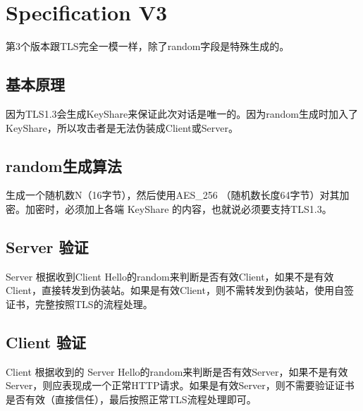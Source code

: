\chapter{Specification V3}
第3个版本跟TLS完全一模一样，除了random字段是特殊生成的。

\section{基本原理}
因为TLS1.3会生成KeyShare来保证此次对话是唯一的。因为random生成时加入了KeyShare，所以攻击者是无法伪装成Client或Server。

\section{random生成算法}
生成一个随机数N（16字节），然后使用AES\_256 （随机数长度64字节）对其加密。加密时，必须加上各端 KeyShare 的内容，也就说必须要支持TLS1.3。

\section{Server 验证}
Server 根据收到Client Hello的random来判断是否有效Client，如果不是有效Client，直接转发到伪装站。如果是有效Client，则不需转发到伪装站，使用自签证书，完整按照TLS的流程处理。

\section{Client 验证}
Client 根据收到的 Server Hello的random来判断是否有效Server，如果不是有效Server，则应表现成一个正常HTTP请求。如果是有效Server，则不需要验证证书是否有效（直接信任），最后按照正常TLS流程处理即可。

